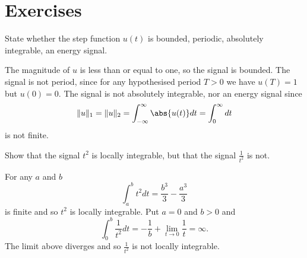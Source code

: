 \section{Exercises}

\begin{excersizelist}

\item \label{excer:stepfunction} State whether the step function $u(t)$ is bounded, periodic, %
absolutely integrable, an energy signal.
\begin{solution}
The magnitude of $u$ is less than or equal to one, so the signal is bounded.  The signal is not period, since for any hypothesised period $T > 0$ we have $u(T) = 1$ but $u(0) = 0$.  %
The signal is not absolutely integrable, nor an energy signal since
\[
\|u\|_1 = \|u\|_2 = \int_{-\infty}^\infty \abs{u(t)} dt = \int_{0}^\infty dt
\]
is not finite.
\end{solution}

\item \label{exer:oneontnotlocallyint} Show that the signal $t^2$ is locally integrable, but that the signal $\frac{1}{t^2}$ is not. 
\begin{solution}
For any $a$ and $b$
\[
\int_a^b t^2 dt = \frac{b^3}{3} - \frac{a^3}{3}
\]
is finite and so $t^2$ is locally integrable.  Put $a = 0$ and $b > 0$ and
\[
\int_0^b \frac{1}{t^2} dt = -\frac{1}{b} + \lim_{t \to 0}\frac{1}{t}  = \infty.
\]
The limit above diverges and so $\frac{1}{t^2}$ is not locally integrable. 
\end{solution}



\end{excersizelist}
